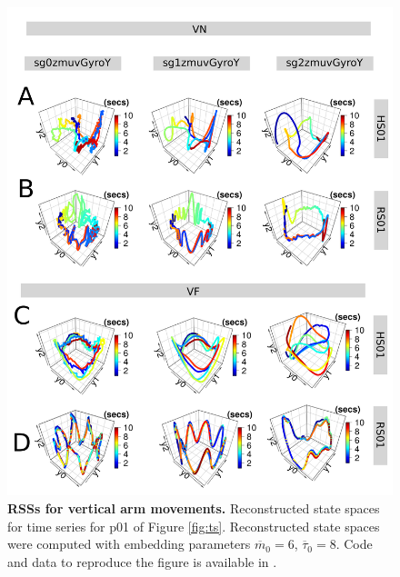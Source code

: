 \documentclass[fleqn,10pt]{wlscirep}
\begin{document}
\begin{figure}[ht]
\centering
\includegraphics[width=1.0\textwidth]{fig4}
    \caption{
	{\bf RSSs for vertical arm movements.}
	Reconstructed state spaces for time series for p01 of Figure \ref{fig:ts}.
	Reconstructed state spaces were computed with 
	embedding parameters
	$\overline{m}_0=6$, $\overline{\tau}_0=8$.
	Code and data to reproduce the figure is available in \cite{srep2020}.
        }
    \label{fig:rss_aVw10}
\end{figure}
\end{document}
